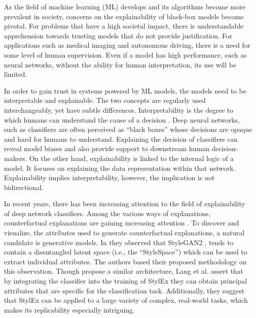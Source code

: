 As the field of machine learning (ML) develops and its algorithms become more prevalent in society, concerns on the explainability of black-box models become pivotal. For problems that have a high societal impact, there is understandable apprehension towards trusting models that do not provide justification. For applications such as medical imaging and autonomous driving, there is a need for some level of human supervision. Even if a model has high performance, such as neural networks, without the ability for human interpretation, its use will be limited.

In order to gain trust in systems powered by ML models, the models need to be interpretable and explainable. The two concepts are regularly used interchangeably, yet have subtle differences. Interpretability is the degree to which humans can understand the cause of a decision \cite{MILLER20191}. Deep neural networks, such as classifiers are often perceived as “black boxes”
whose decisions are opaque and hard for humans to understand. Explaining the decision of classifiers can reveal model biases\cite{17kim2018interpretability} and also provide support to downstream human decision-makers. On the other hand, explainability is linked to the internal logic of a model. It focuses on explaining the data representation within that network. Explainability implies interpretability, however, the implication is not bidirectional.

In recent years, there has been increasing attention to the field of explainability of deep network classifiers. Among the various ways of explanations, counterfactual explanations are gaining increasing attention \cite{19mothilal2020explaining,11goyal2019counterfactual,33goyal2019counterfactual}. 
To discover and visualize, the attributes used to generate counterfactual explanations, a natural candidate is generative models. 
In \cite{35wu2021stylespace} they observed that StyleGAN2 \cite{Karras2020AnalyzingAI}, tends to contain a disentangled latent space (i.e., the “StyleSpace”) which can be used to extract individual attributes.  
The authors based their proposed methodology \cite{Lang2021ExplainingIS} on this observation. Though \cite{schutte2021using} propose a similar architecture, Lang et al. assert that by integrating the classifier into the training of StylEx they can obtain principal attributes that are specific for the classification task. Additionally, they suggest that StylEx can be applied to a large variety of complex, real-world tasks, which makes its replicability especially intriguing.

